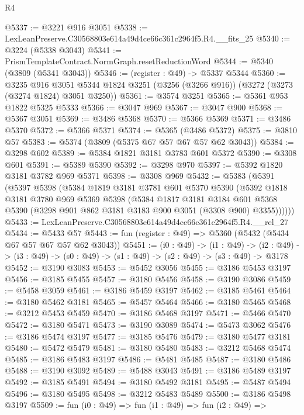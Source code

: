 \begin{lexlean}{R4}
\begin{coremodule}
@5337 := @3221 @916 @3051
@5338 := LexLeanPreserve.C30568803e614a49d4ce66c361c2964f5.R4.__fits_25
@5340 := @3224 (@5338 @3043)
@5341 := PrismTemplateContract.NormGraph.resetReductionWord
@5344 := @5340 (@3809 (@5341 @3043))
@5346 := (register : @49) -> @5337 @5344
@5360 := @3235
    @916
    @3051
    @5344
    @1824
    @3251
    (@3256 (@3266 @916))
    (@3272 (@3273 (@3274 @1824) @3051 @3250))
@5361 := @3574 @3251
@5365 := @5361 @953 @1822 @5325 @5333
@5366 := @3047 @969
@5367 := @3047 @900
@5368 := @5367 @3051
@5369 := @3486 @5368
@5370 := @5366 @5369
@5371 := @3486 @5370
@5372 := @5366 @5371
@5374 := @5365 (@3486 @5372)
@5375 := @3810 @57
@5383 := @5374 (@3809 (@5375 @67 @57 @67 @57 @62 @3043))
@5384 := @3298 @602
@5389 := @5384 @1821 @3181 @3783 @601 @5372
@5390 := @3308 @601
@5391 := @5389 @5390
@5392 := @3298 @970
@5397 := @5392 @1820 @3181 @3782 @969 @5371
@5398 := @3308 @969
@5432 := @5383
    (@5391
      (@5397
        @5398
        (@5384
          @1819
          @3181
          @3781
          @601
          @5370
          @5390
          (@5392
            @1818
            @3181
            @3780
            @969
            @5369
            @5398
            (@5384
              @1817
              @3181
              @3184
              @601
              @5368
              @5390
              (@3298 @901 @862 @3181 @3183 @900 @3051 (@3308 @900) @3355))))))
@5433 := LexLeanPreserve.C30568803e614a49d4ce66c361c2964f5.R4.__rel_27
@5434 := @5433 @57
@5443 := fun (register : @49) => @5360 (@5432 (@5434 @67 @57 @67 @57 @62 @3043))
@5451 := (i0 : @49) ->
  (i1 : @49) ->
  (i2 : @49) -> (i3 : @49) -> (s0 : @49) -> (s1 : @49) -> (s2 : @49) -> (s3 : @49) -> @3178
@5452 := @3190 @3083
@5453 := @5452 @3056
@5455 := @3186 @5453 @3197
@5456 := @3185 @5455
@5457 := @3180 @5456
@5458 := @3190 @3086
@5459 := @5458 @3059
@5461 := @3186 @5459 @3197
@5462 := @3185 @5461
@5464 := @3180 @5462 @3181
@5465 := @5457 @5464
@5466 := @3180 @5465
@5468 := @3212 @5453 @5459
@5470 := @3186 @5468 @3197
@5471 := @5466 @5470
@5472 := @3180 @5471
@5473 := @3190 @3089
@5474 := @5473 @3062
@5476 := @3186 @5474 @3197
@5477 := @3185 @5476
@5479 := @3180 @5477 @3181
@5480 := @5472 @5479
@5481 := @3180 @5480
@5483 := @3212 @5468 @5474
@5485 := @3186 @5483 @3197
@5486 := @5481 @5485
@5487 := @3180 @5486
@5488 := @3190 @3092
@5489 := @5488 @3043
@5491 := @3186 @5489 @3197
@5492 := @3185 @5491
@5494 := @3180 @5492 @3181
@5495 := @5487 @5494
@5496 := @3180 @5495
@5498 := @3212 @5483 @5489
@5500 := @3186 @5498 @3197
@5509 := fun (i0 : @49) =>
  fun (i1 : @49) =>
  fun (i2 : @49) =>

\end{coremodule}
\end{lexlean}
